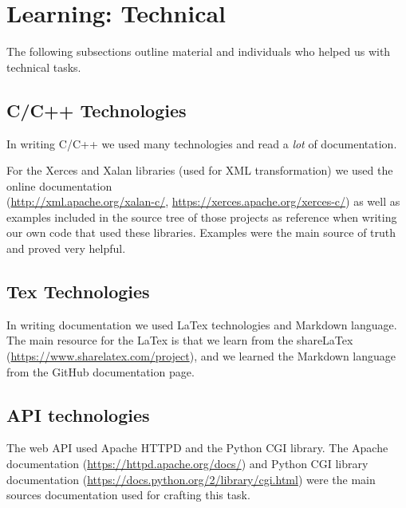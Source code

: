 \section{Learning: Technical}

The following subsections outline material and individuals who helped us with technical tasks.

\subsection{C/C++ Technologies}

In writing C/C++ we used many technologies and read a \textit{lot} of documentation.

For the Xerces and Xalan libraries (used for XML transformation) we used the online documentation \\ (\url{http://xml.apache.org/xalan-c/}, \url{https://xerces.apache.org/xerces-c/}) as well as examples included in the source tree of those projects as reference when writing our own code that used these libraries.
Examples were the main source of truth and proved very helpful.

\subsection{Tex Technologies}

In writing documentation we used LaTex technologies and Markdown language.
The main resource for the LaTex is that we learn from the shareLaTex (\url{https://www.sharelatex.com/project}), and we learned the Markdown language from the GitHub documentation page.

\subsection{API technologies}

The web API used Apache HTTPD and the Python CGI library.
The Apache documentation (\url{https://httpd.apache.org/docs/}) and Python CGI library documentation (\url{https://docs.python.org/2/library/cgi.html}) were the main sources documentation used for crafting this task.

